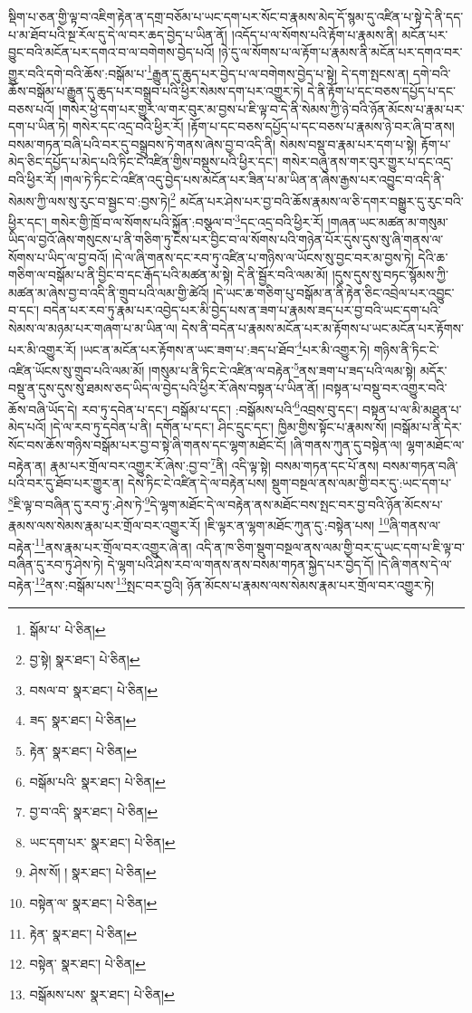 སྡིག་པ་ཅན་གྱི་ལྟ་བ་འཇིག་རྟེན་ན་དགྲ་བཅོམ་པ་ཡང་དག་པར་སོང་བ་རྣམས་མེད་དོ་སྙམ་དུ་འཛིན་པ་སྟེ་དེ་ནི་དད་པ་མ་ཐོབ་པའི་སྔ་རོལ་དུ་དེ་ལ་བར་ཆད་བྱེད་པ་ཡིན་ནོ། །འདོད་པ་ལ་སོགས་པའི་རྟོག་པ་རྣམས་ནི། མངོན་པར་བྱུང་བའི་མངོན་པར་དགའ་བ་ལ་བགེགས་བྱེད་པའོ། །ཉེ་དུ་ལ་སོགས་པ་ལ་རྟོག་པ་རྣམས་ནི་མངོན་པར་དགའ་བར་གྱུར་བའི་དགེ་བའི་ཆོས་:བསྒོམ་པ་\footnote{སྒོམ་པ་  པེ་ཅིན། }རྒྱུན་དུ་ཆུད་པར་བྱེད་པ་ལ་བགེགས་བྱེད་པ་སྟེ། དེ་དག་སྤངས་ན། དགེ་བའི་ཆོས་བསྒོམ་པ་རྒྱུན་དུ་ཆུད་པར་བསྒྲུབ་པའི་ཕྱིར་སེམས་དག་པར་འགྱུར་ཏེ། དེ་ནི་རྟོག་པ་དང་བཅས་དཔྱོད་པ་དང་བཅས་པའོ། །གསེར་ཕྱེ་དག་པར་གྱུར་ལ་གར་བུར་མ་བྱས་པ་ཇི་ལྟ་བ་དེ་ནི་སེམས་ཀྱི་ཉེ་བའི་ཉོན་མོངས་པ་རྣམ་པར་དག་པ་ཡིན་ཏེ། གསེར་དང་འདྲ་བའི་ཕྱིར་རོ། །རྟོག་པ་དང་བཅས་དཔྱོད་པ་དང་བཅས་པ་རྣམས་ཉེ་བར་ཞི་བ་ནས། བསམ་གཏན་བཞི་པའི་བར་དུ་བསྒྲུབས་ཏེ་གནས་ཞེས་བྱ་བ་འདི་ནི། སེམས་བསྡུ་བ་རྣམ་པར་དག་པ་སྟེ། རྟོག་པ་མེད་ཅིང་དཔྱོད་པ་མེད་པའི་ཏིང་ངེ་འཛིན་གྱིས་བསྡུས་པའི་ཕྱིར་དང་། གསེར་བཞུ་ནས་གར་བུར་གྱུར་པ་དང་འདྲ་བའི་ཕྱིར་རོ། །གལ་ཏེ་ཏིང་ངེ་འཛིན་འདུ་བྱེད་པས་མངོན་པར་ཟིན་པ་མ་ཡིན་ན་ཞེས་རྒྱས་པར་འབྱུང་བ་འདི་ནི་སེམས་ཀྱི་ལས་སུ་རུང་བ་སྦྱང་བ་:བྱས་ཏེ།\footnote{བྱ་སྟེ།  སྣར་ཐང་།  པེ་ཅིན། } མངོན་པར་ཤེས་པར་བྱ་བའི་ཆོས་རྣམས་ལ་ཅི་དགར་བསྒྱུར་དུ་རུང་བའི་ཕྱིར་དང་། གསེར་གྱི་ཁྲོ་བ་ལ་སོགས་པའི་སྐྱོན་:བསྩལ་བ་\footnote{བསལ་བ་  སྣར་ཐང་།  པེ་ཅིན། }དང་འདྲ་བའི་ཕྱིར་རོ། །གཞན་ཡང་མཚན་མ་གསུམ་ཡིད་ལ་བྱའོ་ཞེས་གསུངས་པ་ནི་གཅིག་ཏུ་ངེས་པར་བྱིང་བ་ལ་སོགས་པའི་གཉེན་པོར་དུས་དུས་སུ་ཞི་གནས་ལ་སོགས་པ་ཡིད་ལ་བྱ་བའོ། །དེ་ལ་ཞི་གནས་དང་རབ་ཏུ་འཛིན་པ་གཉིས་ལ་ཡོངས་སུ་བྱང་བར་མ་བྱས་ཏེ། དེའི་ཆ་གཅིག་ལ་བསྒོམ་པ་ནི་བྱིང་བ་དང་རྒོད་པའི་མཚན་མ་སྟེ། དེ་ནི་སྦྱོར་བའི་ལམ་མོ། །དུས་དུས་སུ་བཏང་སྙོམས་ཀྱི་མཚན་མ་ཞེས་བྱ་བ་འདི་ནི་གྲུབ་པའི་ལམ་གྱི་ཚེའོ། །དེ་ཡང་ཆ་གཅིག་པུ་བསྒོམ་ན་ནི་རྟེན་ཅིང་འབྲེལ་པར་འབྱུང་བ་དང་། བདེན་པར་རབ་ཏུ་རྣམ་པར་འབྱེད་པར་མི་བྱེད་པས་ན་ཟག་པ་རྣམས་ཟད་པར་བྱ་བའི་ཡང་དག་པའི་སེམས་ལ་མཉམ་པར་གཞག་པ་མ་ཡིན་ལ། དེས་ནི་བདེན་པ་རྣམས་མངོན་པར་མ་རྟོགས་པ་ཡང་མངོན་པར་རྟོགས་པར་མི་འགྱུར་རོ། །ཡང་ན་མངོན་པར་རྟོགས་ན་ཡང་ཟག་པ་:ཟད་པ་ཐོབ་\footnote{ཟད་  སྣར་ཐང་།  པེ་ཅིན། }པར་མི་འགྱུར་ཏེ། གཉིས་ནི་ཏིང་ངེ་འཛིན་ཡོངས་སུ་གྲུབ་པའི་ལམ་མོ། །གསུམ་པ་ནི་ཏིང་ངེ་འཛིན་ལ་བརྟེན་\footnote{རྟེན་  སྣར་ཐང་།  པེ་ཅིན། }ནས་ཟག་པ་ཟད་པའི་ལམ་སྟེ། མདོར་བསྡུ་ན་དུས་དུས་སུ་ཐམས་ཅད་ཡིད་ལ་བྱེད་པའི་ཕྱིར་རོ་ཞེས་བསྟན་པ་ཡིན་ནོ། །བསྟན་པ་བསྡུ་བར་འགྱུར་བའི་ཆོས་བཞི་ཡོད་དེ། རབ་ཏུ་དབེན་པ་དང་། བསྒོམ་པ་དང་། :བསྒོམས་པའི་\footnote{བསྒོམ་པའི་  སྣར་ཐང་།  པེ་ཅིན། }འབྲས་བུ་དང་། བསྟན་པ་ལ་མི་མཐུན་པ་མེད་པའོ། །དེ་ལ་རབ་ཏུ་དབེན་པ་ནི། དགོན་པ་དང་། ཤིང་དྲུང་དང་། ཁྱིམ་གྱིས་སྟོང་པ་རྣམས་སོ། །བསྒོམ་པ་ནི་དེར་སོང་བས་ཆོས་གཉིས་བསྒོམ་པར་བྱ་བ་སྟེ་ཞི་གནས་དང་ལྷག་མཐོང་ངོ། །ཞི་གནས་ཀུན་དུ་བསྟེན་ལ། ལྷག་མཐོང་ལ་བརྟེན་ན། རྣམ་པར་གྲོལ་བར་འགྱུར་རོ་ཞེས་:བྱ་བ་\footnote{བྱ་བ་འདི་  སྣར་ཐང་།  པེ་ཅིན། }ནི། འདི་ལྟ་སྟེ། བསམ་གཏན་དང་པོ་ནས། བསམ་གཏན་བཞི་པའི་བར་དུ་ཐོབ་པར་གྱུར་ན། དེས་ཏིང་ངེ་འཛིན་དེ་ལ་བརྟེན་པས། སྡུག་བསྔལ་ནས་ལམ་གྱི་བར་དུ་:ཡང་དག་པ་\footnote{ཡང་དག་པར་  སྣར་ཐང་།  པེ་ཅིན། }ཇི་ལྟ་བ་བཞིན་དུ་རབ་ཏུ་:ཤེས་ཏེ་\footnote{ཤེས་སོ། །  སྣར་ཐང་།  པེ་ཅིན། }དེ་ལྷག་མཐོང་དེ་ལ་བརྟེན་ནས་མཐོང་བས་སྤང་བར་བྱ་བའི་ཉོན་མོངས་པ་རྣམས་ལས་སེམས་རྣམ་པར་གྲོལ་བར་འགྱུར་རོ། །ཇི་ལྟར་ན་ལྷག་མཐོང་ཀུན་དུ་:བསྟེན་པས། \footnote{བསྟེན་ལ་  སྣར་ཐང་།  པེ་ཅིན། }ཞི་གནས་ལ་བརྟེན་\footnote{རྟེན་  སྣར་ཐང་།  པེ་ཅིན། }ནས་རྣམ་པར་གྲོལ་བར་འགྱུར་ཞེ་ན། འདི་ན་ཁ་ཅིག་སྡུག་བསྔལ་ནས་ལམ་གྱི་བར་དུ་ཡང་དག་པ་ཇི་ལྟ་བ་བཞིན་དུ་རབ་ཏུ་ཤེས་ཏེ། དེ་ལྷག་པའི་ཤེས་རབ་ལ་གནས་ནས་བསམ་གཏན་སྐྱེད་པར་བྱེད་དོ། །དེ་ཞི་གནས་དེ་ལ་བརྟེན་\footnote{བསྟེན་  སྣར་ཐང་།  པེ་ཅིན། }ནས་:བསྒོམ་པས་\footnote{བསྒོམས་པས་  སྣར་ཐང་།  པེ་ཅིན། }སྤང་བར་བྱའི། ཉོན་མོངས་པ་རྣམས་ལས་སེམས་རྣམ་པར་གྲོལ་བར་འགྱུར་ཏེ། 